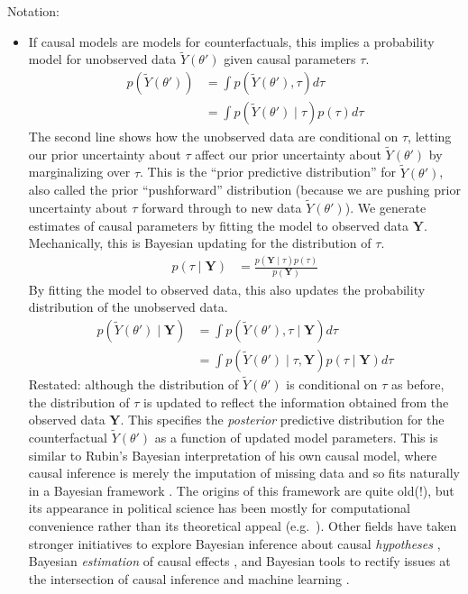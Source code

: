 \documentclass[12pt
              ]{article}
\begin{document}
Notation:
\begin{itemize}
  \item If causal models are models for counterfactuals, this implies a probability model for unobserved data $\tilde{Y}(\theta')$ given causal parameters $\tau$.
  \begin{align}
    p(\tilde{Y}(\theta')) 
      &= \int p(\tilde{Y}(\theta'), \tau)d\tau \\
      &= \int p(\tilde{Y}(\theta') \mid \tau)p(\tau)d\tau
  \end{align}
  The second line shows how the unobserved data are conditional on $\tau$, letting our prior uncertainty about $\tau$ affect our prior uncertainty about $\tilde{Y}(\theta')$ by marginalizing over $\tau$.
  This is the ``prior predictive distribution'' for $\tilde{Y}(\theta')$, also called the prior ``pushforward'' distribution (because we are pushing prior uncertainty about $\tau$ forward through to new data $\tilde{Y}(\theta')$).
  We generate estimates of causal parameters by fitting the model to observed data $\mathbf{Y}$.
  Mechanically, this is Bayesian updating for the distribution of $\tau$.
  \begin{align}
    p(\tau \mid \mathbf{Y}) &= \frac{p(\mathbf{Y} \mid \tau)p(\tau)}{p(\mathbf{Y})}
  \end{align}
  By fitting the model to observed data, this also updates the probability distribution of the unobserved data.
  \begin{align}
    p(\tilde{Y}(\theta') \mid \mathbf{Y}) 
      &= \int p(\tilde{Y}(\theta'), \tau \mid \mathbf{Y}) d\tau \\
      &= \int p(\tilde{Y}(\theta') \mid \tau, \mathbf{Y})p(\tau \mid \mathbf{Y})d\tau
  \end{align}
  Restated: although the distribution of $\tilde{Y}(\theta')$ is conditional on $\tau$ as before, the distribution of $\tau$ is updated to reflect the information obtained from the observed data $\mathbf{Y}$.
  This specifies the \emph{posterior} predictive distribution for the counterfactual $\tilde{Y}(\theta')$ as a function of updated model parameters.
  This is similar to Rubin's Bayesian interpretation of his own causal model, where causal inference is merely the imputation of missing data and so fits naturally in a Bayesian framework \parencite{rubin:1978:bayesian,rubin:2005:potential-outcomes}.
  The origins of this framework are quite old(!), but its appearance in political science has been mostly for computational convenience rather than its theoretical appeal (e.g.\ \cite{horiuchi2007designing}).
  Other fields have taken stronger initiatives to explore Bayesian inference about causal \emph{hypotheses} \parencite{baldi-shahbaba:2019:bayesian-causality}, Bayesian \emph{estimation} of causal effects \parencite{hill:2011:bart, oganisian-roy:2020:bayes-estimation}, and Bayesian tools to rectify issues at the intersection of causal inference and machine learning  \parencite{hahn-et-al:2020:causal-bart}.
\end{itemize}
\end{document}
